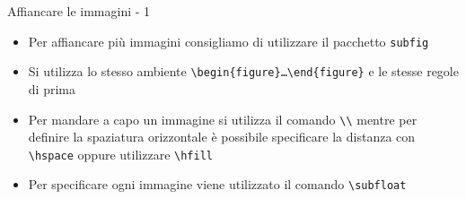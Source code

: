 \begin{frame}{Affiancare le immagini - 1}

\begin{itemize}
	\item Per affiancare più immagini consigliamo di utilizzare il pacchetto 
	\texttt{subfig}
	\item Si utilizza lo stesso ambiente 
	\texttt{\textbackslash{}begin\{figure\}\dots{}\textbackslash{}end\{figure\}}
	e le stesse regole di prima
	\item Per mandare a capo un immagine si utilizza il comando 
	\texttt{\textbackslash{}\textbackslash{}} mentre per definire la spaziatura 
	orizzontale è possibile specificare la distanza con 
	\texttt{\textbackslash{}hspace} oppure utilizzare 
	\texttt{\textbackslash{}hfill}
	\item Per specificare ogni immagine viene utilizzato il comando
	\texttt{\textbackslash{}subfloat}
\end{itemize}

\end{frame}
